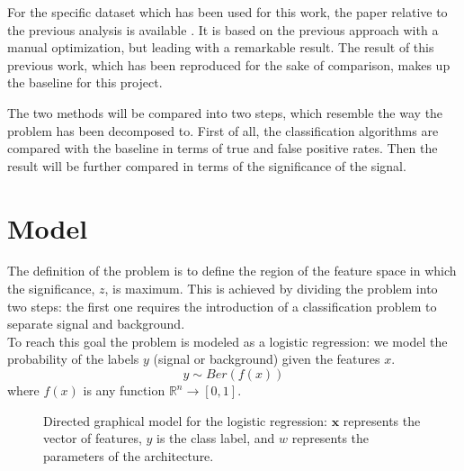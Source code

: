 \documentclass{article}
\begin{document}
For the specific dataset which has been used for this work, the paper relative to the previous analysis is available \cite{Aaboud:2016ftt}. It is based on the previous approach with a manual optimization, but leading with a remarkable result. The result of this previous work, which has been reproduced for the sake of comparison, makes up the baseline for this project.

The two methods will be compared into two steps, which resemble the way the problem has been decomposed to.
First of all, the classification algorithms are compared with the baseline in terms of true and false positive rates. Then the result will be further compared in terms of the significance of the signal.

\section{Model}
\label{sec:model}

The definition of the problem is to define the region of the feature space in which the significance, $z$, is maximum. This is achieved by dividing the problem into two steps: the first one requires the introduction of a classification problem to separate signal and background. \\
To reach this goal the problem is modeled as a logistic regression: we model the probability of the labels $y$ (signal or background) given the features $x$.
\begin{equation}
\label{eqn:y_distribution}
    y \sim Ber(f(x)) 
\end{equation}
where $f(x)$ is any function $\mathbb{R}^n \rightarrow \left[0,1 \right]$.



\begin{figure}[!h]
  \centering
  \caption{\label{fig:diagram} Directed graphical model for the logistic regression: $\mathbf{x}$ represents the vector of features, $y$ is the class label, and $w$ represents the parameters of the architecture.}
\end{figure}
\end{document}
